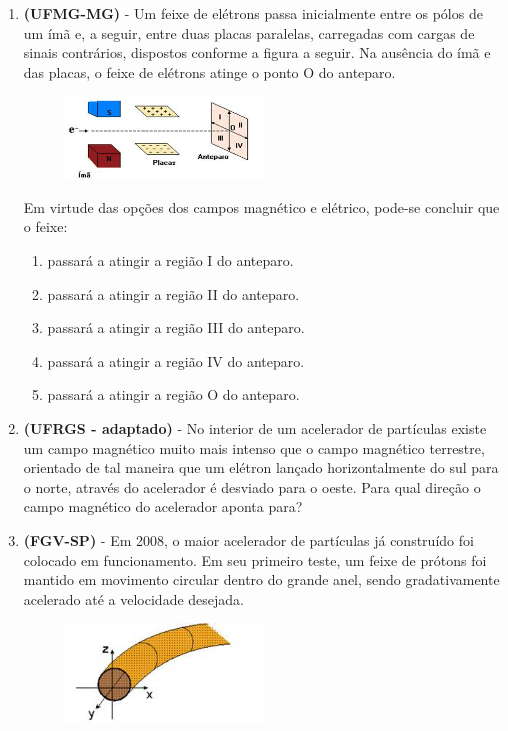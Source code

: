 \documentclass[12pt,letterpaper,fleqn]{article}
\begin{document}
\begin{itemize}
\begin{enumerate}
            \item \textbf{(UFMG-MG)} - Um feixe de elétrons passa inicialmente entre os pólos de um ímã e, a seguir, entre duas placas paralelas, carregadas com cargas de sinais contrários, dispostos conforme a figura a seguir. Na ausência do ímã e das placas, o feixe de elétrons atinge o ponto O do anteparo.
            \begin{figure}[h]
                \centering
                \includegraphics[width=0.5\textwidth]{ex_6_forca.jpg}
            \end{figure}
            
            Em virtude das opções dos campos magnético e elétrico, pode-se concluir que o feixe:
            \begin{enumerate}
                \item passará a atingir a região I do anteparo.
                \item passará a atingir a região II do anteparo.
                \item passará a atingir a região III do anteparo.
                \item passará a atingir a região IV do anteparo.
                \item passará a atingir a região O do anteparo.
            \end{enumerate}
            
            \item \textbf{(UFRGS - adaptado)} - No interior de um acelerador de partículas existe um campo magnético muito mais intenso que o campo magnético terrestre, orientado de tal maneira que um elétron lançado horizontalmente do sul para o norte, através do acelerador é desviado para o oeste. Para qual direção o campo magnético do acelerador aponta para?
            
            \item \textbf{(FGV-SP)} - Em 2008, o maior acelerador de partículas já construído foi colocado em funcionamento. Em seu primeiro teste, um feixe de prótons foi mantido em movimento circular dentro do grande anel, sendo gradativamente acelerado até a velocidade desejada.
            
            \begin{figure}[h]
                \centering
                \includegraphics[width=0.5\textwidth]{ex_8_forca.jpg}
            \end{figure}
            

\end{enumerate}
\end{itemize}
\end{document}
